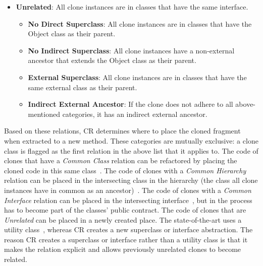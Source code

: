 \documentclass[a4paper,UKenglish,cleveref, autoref, thm-restate,authorcolumns]{lipics-v2019}
\begin{document}
\begin{itemize}
\begin{itemize}
    \end{itemize}
    \item \textbf{Unrelated}: All clone instances are in classes that have the same interface.
    \begin{itemize}
        \item \textbf{No Direct Superclass}: All clone instances are in classes that have the Object class as their parent.
        \item \textbf{No Indirect Superclass}: All clone instances have a non-external ancestor that extends the Object class as their parent.
        \item \textbf{External Superclass}: All clone instances are in classes that have the same external class as their parent.
        \item \textbf{Indirect External Ancestor}: If the clone does not adhere to all above-mentioned categories, it has an indirect external ancestor.
    \end{itemize}
\end{itemize}

Based on these relations, CR determines where to place the cloned fragment when extracted to a new method. These categories are mutually exclusive: a clone class is flagged as the first relation in the above list that it applies to. The code of clones that have a \textit{Common Class} relation can be refactored by placing the cloned code in this same class~\cite{fowler2018refactoring}. The code of clones with a \textit{Common Hierarchy} relation can be placed in the intersecting class in the hierarchy (the class all clone instances have in common as an ancestor)~\cite{fowler2018refactoring}. The code of clones with a \textit{Common Interface} relation can be placed in the intersecting interface~\cite{mohnen2002interfaces}, but in the process has to become part of the classes' public contract. The code of clones that are \textit{Unrelated} can be placed in a newly created place. The state-of-the-art uses a utility class~\cite{mazinanian2016jdeodorant}, whereas CR creates a new superclass or interface abstraction. The reason CR creates a superclass or interface rather than a utility class is that it makes the relation explicit and allows previously unrelated clones to become related.
\end{document}
